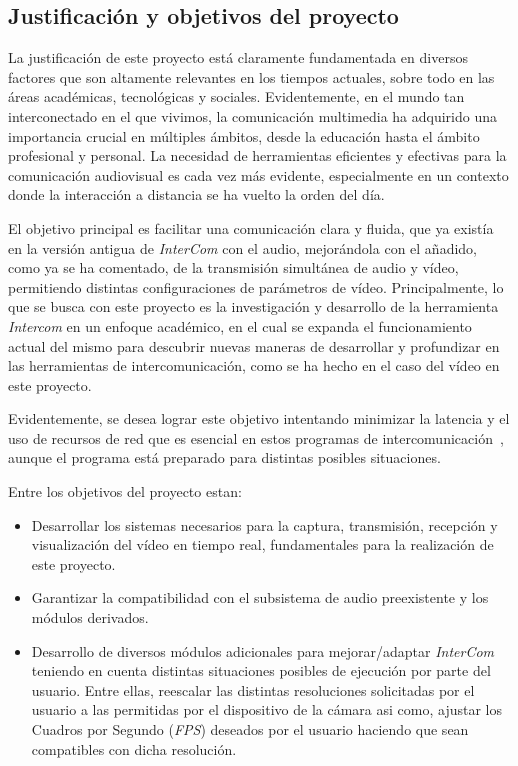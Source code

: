 \subsection{Justificación y objetivos del proyecto}
La justificación de este proyecto está claramente fundamentada en diversos factores que son altamente relevantes en los tiempos actuales, sobre todo en las áreas académicas, tecnológicas y sociales. Evidentemente, en el mundo tan interconectado en el que vivimos, la comunicación multimedia ha adquirido una importancia crucial en múltiples ámbitos, desde la educación hasta el ámbito profesional y personal. La necesidad de herramientas eficientes y efectivas para la comunicación audiovisual es cada vez más evidente, especialmente en un contexto donde la interacción a distancia se ha vuelto la orden del día.\cite{GSMA}
\vspace{\baselineskip}

El objetivo principal es facilitar una comunicación clara y fluida, que ya existía en la versión antigua de \textit{InterCom} con el audio, mejorándola con el añadido, como ya se ha comentado, de la transmisión simultánea de audio y vídeo, permitiendo distintas configuraciones de parámetros de vídeo. Principalmente, lo que se busca con este proyecto es la investigación y desarrollo de la herramienta \textit{Intercom} en un enfoque académico, en el cual se expanda el funcionamiento actual del mismo para descubrir nuevas maneras de desarrollar y profundizar en las herramientas de intercomunicación, como se ha hecho en el caso del vídeo en este proyecto.

\vspace{\baselineskip}
Evidentemente, se desea lograr este objetivo intentando minimizar la latencia y el uso de recursos de red que es esencial en estos programas de intercomunicación~\cite{cisco}, aunque el programa está preparado para distintas posibles situaciones.

\vspace{\baselineskip}

Entre los objetivos del proyecto estan:

\begin{itemize}
	\item Desarrollar los sistemas necesarios para la captura, transmisión, recepción y visualización del vídeo en tiempo real, fundamentales para la realización de este proyecto.
	\item Garantizar la compatibilidad con el subsistema de audio preexistente y los módulos derivados.
	\item Desarrollo de diversos módulos adicionales para mejorar/adaptar \textit{InterCom} teniendo en cuenta distintas situaciones posibles de ejecución por parte del usuario. Entre ellas, reescalar las distintas resoluciones solicitadas por el usuario a las permitidas por el dispositivo de la cámara asi como, ajustar los Cuadros por Segundo (\textit{FPS}) deseados por el usuario haciendo que sean compatibles con dicha resolución.
\end{itemize}
\vspace{\baselineskip}



